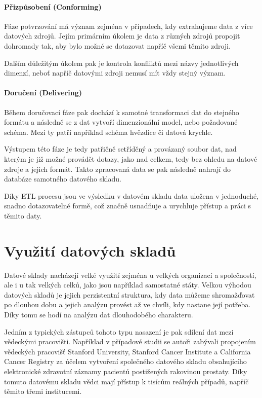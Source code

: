 \documentclass[
  digital,     %
  twoside,     %
  lof,         %
  lot,         %
]{fithesis4}
\begin{document}
\paragraph{Přizpůsobení (Conforming)}
Fáze potvrzování má význam zejména v případech, kdy extrahujeme data z více
datových zdrojů. Jejím primárním úkolem je data z různých zdrojů propojit dohromady tak,
aby bylo možné se dotazovat napříč všemi těmito zdroji. \parencite[s.~19]{Kimballc2004}

Dalším důležitým úkolem pak je kontrola konfliktů mezi názvy jednotlivých dimenzí, neboť
napříč datovými zdroji nemusí mít vždy stejný význam. \parencite{Kimballc2004}

\paragraph{Doručení (Delivering)}
Během doručovací fáze pak dochází k samotné transformaci dat do stejného formátu a
následně se z dat vytvoří dimenzionální model, nebo požadované schéma. Mezi ty patří například
schéma hvězdice či datová krychle.\parencite[s.~19]{Kimballc2004}

Výstupem této fáze je tedy patřičně setříděný a provázaný soubor dat, nad kterým
je již možné provádět dotazy, jako nad celkem, tedy bez ohledu na datové zdroje a jejich
formát. Takto zpracovaná data se pak následně nahrají do databáze samotného datového
skladu.

Díky ETL procesu jsou ve výsledku v datovém skladu data uložena v jednoduché,
snadno dotazovatelné formě, což značně usnadňuje a urychluje přístup a práci s těmito daty.

\section{Využití datových skladů}
Datové sklady nacházejí velké využití zejména u velkých organizací a společností, ale i
u tak velkých celků, jako jsou například samostatné státy. Velkou výhodou datových skladů je
jejich perzistentní struktura, kdy data můžeme shromažďovat po dlouhou dobu a jejich
analýzu provést až ve chvíli, kdy nastane její potřeba. Díky tomu se hodí na analýzu dat dlouhodobého charakteru.

Jedním z typických zástupců tohoto typu nasazení je pak sdílení dat mezi
vědeckými pracovišti. Například v případové studii  \parencite{Seneviratne20180124} 
se autoři zabývali propojením vědeckých pracovišť Stanford University, Stanford Cancer Institute a California Cancer Registry za účelem vytvoření
společného datového skladu obsahujícího elektronické zdravotní záznamy pacientů
postižených rakovinou prostaty. Díky tomuto datovému skladu vědci mají přístup
k tisícům reálných případů, napříč těmito třemi institucemi.
\end{document}
